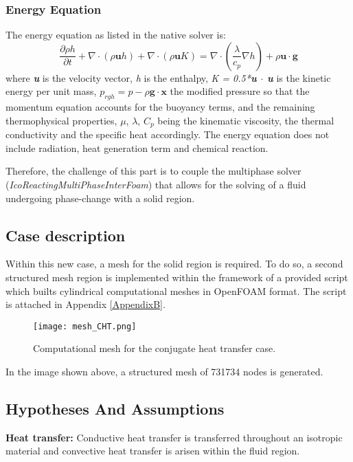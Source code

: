 \subsubsection*{Energy Equation}
The energy equation as listed in the native solver is:
\begin{equation}
	\frac{\partial \rho h}{\partial t}+\nabla \cdot(\rho \boldsymbol{u} h)+\nabla \cdot(\rho \boldsymbol{u} K)=\nabla \cdot\left(\frac{\lambda}{c_{p}} \nabla h\right)+\rho \boldsymbol{u} \cdot \boldsymbol{g}
	\label{4.3}
\end{equation}
where \textit{\textbf{u}} is the velocity vector, \textit{h} is the enthalpy, \textit{K = 0.5*\textbf{u $\cdot$ u}} is the kinetic energy per unit mass, \textit{$p_{rgh}=p-\rho\textbf{g}\cdot\textbf{x}$} the modified pressure so that the momentum equation accounts for the buoyancy terms, and the remaining thermophysical properties, $\mu$, $\lambda$, $C_p$ being the kinematic viscosity, the thermal conductivity and the specific heat accordingly. The energy equation does not include radiation, heat generation term and chemical reaction.

\noindent Therefore, the challenge of this part is to couple the multiphase solver (\textit{IcoReactingMultiPhaseInterFoam}) that allows for the solving of a fluid undergoing phase-change with a solid region.  
\subsection{Case description}

\setlength{\parindent}{0.5cm} Within this new case, a mesh for the solid region is required. To do so, a second structured mesh region is implemented within the framework of a provided script which builts cylindrical computational meshes in OpenFOAM format. The script is attached in Appendix \ref{AppendixB}.
\begin{figure}[h!]
	\centering
	\texttt{[image: mesh\_CHT.png]}	
	\label{4.1fig}
	\caption{Computational mesh for the conjugate heat transfer case.}
\end{figure} 
\newline
In the image shown above, a structured mesh of 731734 nodes is generated.
\subsection{Hypotheses And Assumptions}
\textbf{Heat transfer:} Conductive heat transfer is transferred throughout an isotropic material and convective heat transfer is arisen within the fluid region. 

